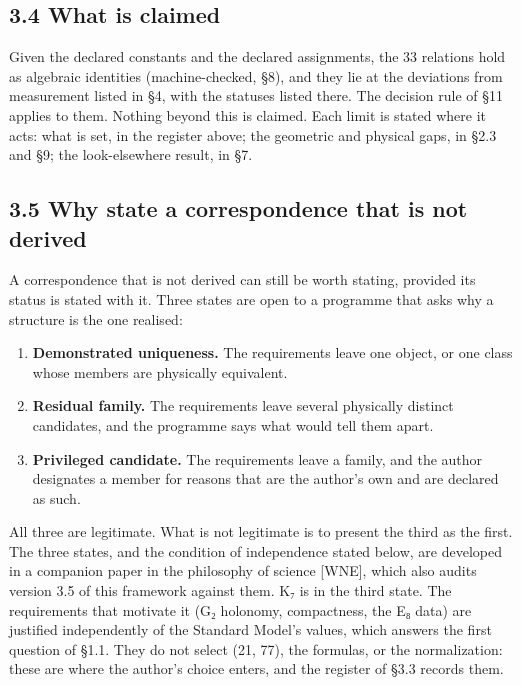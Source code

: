 \documentclass[11pt,a4paper]{article}
\begin{document}
\subsection{3.4 What is claimed}\label{what-is-claimed}

Given the declared constants and the declared assignments, the 33 relations hold as algebraic identities (machine-checked, §8), and they lie at the deviations from measurement listed in §4, with the statuses listed there. The decision rule of §11 applies to them. Nothing beyond this is claimed. Each limit is stated where it acts: what is set, in the register above; the geometric and physical gaps, in §2.3 and §9; the look-elsewhere result, in §7.

\subsection{3.5 Why state a correspondence that is not derived}\label{why-state-a-correspondence-that-is-not-derived}

A correspondence that is not derived can still be worth stating, provided its status is stated with it. Three states are open to a programme that asks why a structure is the one realised:

\begin{enumerate}
\def\labelenumi{\arabic{enumi}.}
\tightlist
\item
  \textbf{Demonstrated uniqueness.} The requirements leave one object, or one class whose members are physically equivalent.
\item
  \textbf{Residual family.} The requirements leave several physically distinct candidates, and the programme says what would tell them apart.
\item
  \textbf{Privileged candidate.} The requirements leave a family, and the author designates a member for reasons that are the author's own and are declared as such.
\end{enumerate}

All three are legitimate. What is not legitimate is to present the third as the first. The three states, and the condition of independence stated below, are developed in a companion paper in the philosophy of science {[}WNE{]}, which also audits version 3.5 of this framework against them. K₇ is in the third state. The requirements that motivate it (G₂ holonomy, compactness, the E₈ data) are justified independently of the Standard Model's values, which answers the first question of §1.1. They do not select (21, 77), the formulas, or the normalization: these are where the author's choice enters, and the register of §3.3 records them.
\end{document}
